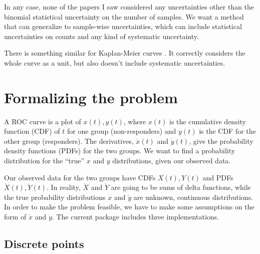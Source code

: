 \documentclass[11pt]{article}
\newcommand{\xdot}{\dot{x}}
\newcommand{\ydot}{\dot{y}}
\newcommand{\Xdot}{\dot{X}}
\newcommand{\Ydot}{\dot{Y}}
\begin{document}
In any case, none of the papers I saw considered any uncertainties other than the binomial statistical uncertainty on the number of samples.  We want a method that can generalize to sample-wise uncertainties, which can include statistical uncertainties on counts and any kind of systematic uncertainty.

There is something similar for Kaplan-Meier curves \autocite{kaplanmeier_sachs}.  It correctly considers the whole curve as a unit, but also doesn't include systematic uncertainties.

\section{Formalizing the problem}

A ROC curve is a plot of \(x(t), y(t)\), where \(x(t)\) is the cumulative density function (CDF) of \(t\) for one group (non-responders) and \(y(t)\) is the CDF for the other group (responders).  The derivatives, \(\xdot(t)\) and \(\ydot(t)\), give the probability density functions (PDFs) for the two groups.   We want to find a probability distribution for the ``true'' \(x\) and \(y\) distributions, given our observed data.

Our observed data for the two groups have CDFs \(X(t), Y(t)\) and PDFs \(\Xdot(t), \Ydot(t)\).  In reality, \(\Xdot\) and \(\Ydot\) are going to be sums of delta functions, while the true probability distributions \(\xdot\) and \(\ydot\) are unknown, continuous distributions.  In order to make the problem feasible, we have to make some assumptions on the form of \(\xdot\) and \(\ydot\).  The current package includes three implementations.

\subsection{Discrete points}
\label{sec:discrete}
\end{document}
